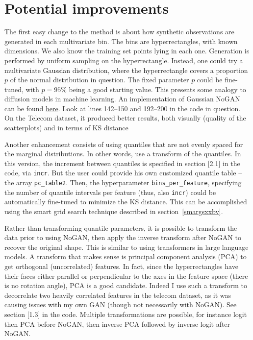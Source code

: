 \documentclass[oneside,10pt]{book}
\begin{document}
\section{Potential improvements}

The first easy change to the method is about how synthetic observations are generated in each multivariate bin. The bins are hyperrectangles, with known dimensions. We also know the training set points lying in each one. Generation is performed by uniform sampling on the hyperrectangle. Instead, one could try a multivariate Gaussian distribution, where the hyperrectangle covers a proportion $p$ of the normal distribution in question. The fixed parameter $p$ could be fine-tuned, with $p=95\%$ being a good starting value. This presents some analogy to
 \textcolor{index}{diffusion models} in machine learning. An implementation of Gaussian NoGAN can
be found \href{https://github.com/VincentGranville/Main/blob/main/NoGAN_gaussian.py}{here}. Look at lines 142--150 and 192--200 in the code in question. On the Telecom dataset, it produced better results, both visually (quality of the scatterplots) and in terms of KS distance

Another enhancement consists of using quantiles that are not evenly spaced for the marginal distributions. In other words, use a transform of the quantiles. In this version, the increment between quantiles is specified in section [2.1] in the code, via \texttt{incr}.
But the user could provide his own customized quantile table -- the array \texttt{pc\_table2}. Then, the hyperparameter
 \texttt{bins\_per\_feature}, specifying the number of quantile intervals per feature (thus, also \texttt{incr}) could be automatically fine-tuned to minimize the KS distance. This can be accomplished using the
\textcolor{index}{smart grid search}  technique described in section~\ref{smargsxxbv}.

Rather than transforming quantile parameters, it is possible to transform the data prior to using NoGAN, then apply the inverse transform
 after NoGAN to recover the original shape. This is similar to using \textcolor{index}{transformers} in large language models. A transform that makes sense is \textcolor{index}{principal component analysis} (PCA) to
 get orthogonal (uncorrelated) features. In fact, since the hyperrectangles have their faces either parallel or perpendicular to the axes in the feature space (there is no rotation angle), PCA is a good candidate. Indeed I use such a transform to decorrelate two heavily correlated features in the telecom dataset,
 as it was causing issues with my own GAN (though not necessarily with NoGAN). See section [1.3] in the code.
Multiple transformations are possible, for instance logit then PCA before NoGAN, then inverse PCA followed by inverse logit after NoGAN.
\end{document}
